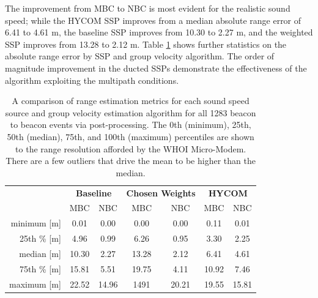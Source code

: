 The improvement from MBC to NBC is most evident for the realistic sound speed; while the HYCOM SSP improves from a median absolute range error of 6.41 to 4.61 m, the baseline SSP improves from 10.30 to 2.27 m, and the weighted SSP improves from 13.28 to 2.12 m.
Table \ref{tab:rangeErrorV1V2} shows further statistics on the absolute range error by SSP and group velocity algorithm.
The order of magnitude improvement in the ducted SSPs demonstrate the effectiveness of the algorithm exploiting the multipath conditions.

\begin{table}[h!]
\renewcommand{\arraystretch}{1.5}
\centering
\begin{tabular}{r|cc|cc|cc}\toprule
 & \multicolumn{2}{c|}{\textbf{Baseline} } & \multicolumn{2}{c|}{\textbf{Chosen Weights} } & \multicolumn{2}{c}{\textbf{HYCOM}} \\
  & \cellcolor[HTML]{EFEFEF}MBC & NBC & \cellcolor[HTML]{EFEFEF} MBC& NBC & \cellcolor[HTML]{EFEFEF}MBC & NBC \\ \hline
 minimum [m] 	& \cellcolor[HTML]{EFEFEF}0.01 & 0.00	& \cellcolor[HTML]{EFEFEF}0.00 	& 0.00 	& \cellcolor[HTML]{EFEFEF}0.11 & 0.01 \\
 25th \% [m]   & \cellcolor[HTML]{EFEFEF}4.96 & 0.99	& \cellcolor[HTML]{EFEFEF}6.26 	& 0.95 	& \cellcolor[HTML]{EFEFEF}3.30 & 2.25 \\   
 median [m]		& \cellcolor[HTML]{EFEFEF}10.30 & 2.27 	& \cellcolor[HTML]{EFEFEF}13.28 & 2.12 	& \cellcolor[HTML]{EFEFEF}6.41 & 4.61 \\
 75th \% [m]   & \cellcolor[HTML]{EFEFEF}15.81 & 5.51 	& \cellcolor[HTML]{EFEFEF}19.75 & 4.11 	& \cellcolor[HTML]{EFEFEF}10.92 & 7.46 \\
 maximum [m]    & \cellcolor[HTML]{EFEFEF}22.52 & 14.96 & \cellcolor[HTML]{EFEFEF}1491  & 20.21 & \cellcolor[HTML]{EFEFEF}19.55 & 15.81 \\
 \toprule
\end{tabular}
\caption[Comparison of post-processing range estimation algorithms across all events]{A comparison of range estimation metrics for each sound speed source and group velocity estimation algorithm for all 1283 beacon to beacon events via post-processing. The 0th (minimum), 25th, 50th (median), 75th, and 100th (maximum) percentiles are shown to the range resolution afforded by the WHOI Micro-Modem. There are a few outliers that drive the mean to be higher than the median.}
\label{tab:rangeErrorV1V2}
\end{table}

